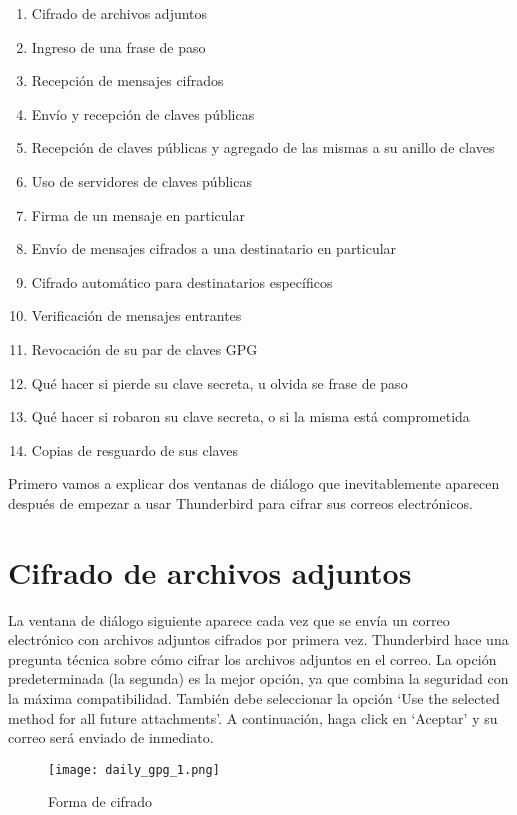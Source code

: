 \documentclass[10pt,a5paper,twoside,,]{book}
\providecommand{\tightlist}{%
  \setlength{\itemsep}{0pt}\setlength{\parskip}{0pt}}
\begin{document}
\begin{enumerate}
\def\labelenumi{\arabic{enumi}.}
\tightlist
\item
  Cifrado de archivos adjuntos
\item
  Ingreso de una frase de paso
\item
  Recepción de mensajes cifrados
\item
  Envío y recepción de claves públicas
\item
  Recepción de claves públicas y agregado de las mismas a su anillo de
  claves
\item
  Uso de servidores de claves públicas
\item
  Firma de un mensaje en particular
\item
  Envío de mensajes cifrados a una destinatario en particular
\item
  Cifrado automático para destinatarios específicos
\item
  Verificación de mensajes entrantes
\item
  Revocación de su par de claves GPG
\item
  Qué hacer si pierde su clave secreta, u olvida se frase de paso
\item
  Qué hacer si robaron su clave secreta, o si la misma está comprometida
\item
  Copias de resguardo de sus claves
\end{enumerate}

Primero vamos a explicar dos ventanas de diálogo que inevitablemente
aparecen después de empezar a usar Thunderbird para cifrar sus correos
electrónicos.

\section{Cifrado de archivos
adjuntos}\label{cifrado-de-archivos-adjuntos}

La ventana de diálogo siguiente aparece cada vez que se envía un correo
electrónico con archivos adjuntos cifrados por primera vez. Thunderbird
hace una pregunta técnica sobre cómo cifrar los archivos adjuntos en el
correo. La opción predeterminada (la segunda) es la mejor opción, ya que
combina la seguridad con la máxima compatibilidad. También debe
seleccionar la opción `Use the selected method for all future
attachments'. A continuación, haga click en `Aceptar' y su correo será
enviado de inmediato.

\begin{figure}[htbp]
\centering
\texttt{[image: daily\_gpg\_1.png]}
\caption{Forma de cifrado}
\end{figure}
\end{document}
